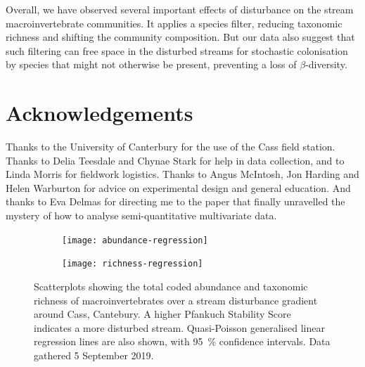 \documentclass[a4paper,10pt]{article}
\newcommand\datadate{5 September 2019} %
\begin{document}
Overall, we have observed several important effects of disturbance on the stream macroinvertebrate communities.
It applies a species filter, reducing taxonomic richness and shifting the community composition.
But our data also suggest that such filtering can free space in the disturbed streams for stochastic colonisation by species that might not otherwise be present, preventing a loss of $\beta$-diversity.

\section*{Acknowledgements}

Thanks to the University of Canterbury for the use of the Cass field station.
Thanks to Delia Teesdale and Chynae Stark for help in data collection, and to Linda Morris for fieldwork logistics.
Thanks to Angus McIntosh, Jon Harding and Helen Warburton for advice on experimental design and general education.
And thanks to Eva Delmas for directing me to the paper that finally unravelled the mystery of how to analyse semi-quantitative multivariate data.

\FloatBarrier
\printbibliography

\clearpage

\begin{figure}[p]
	\centering
	\begin{subfigure}[t]{\textwidth}
		\centering
		\texttt{[image: abundance-regression]}
		\caption{}\label{fig:abundance-regression}
	\end{subfigure}
	\begin{subfigure}[t]{\textwidth}
		\centering
		\texttt{[image: richness-regression]}
		\caption{}\label{fig:richness-regression}
	\end{subfigure}
	\caption[Regression plots]{ %
		Scatterplots showing the total coded abundance and taxonomic richness of macroinvertebrates over a stream disturbance gradient around Cass, Cantebury.
		A higher Pfankuch Stability Score indicates a more disturbed stream.
		Quasi-Poisson generalised linear regression lines are also shown, with \SI{95}{\percent} confidence intervals.
		Data gathered {\datadate}.
	}\label{fig:regressions}
\end{figure}

\end{document}
